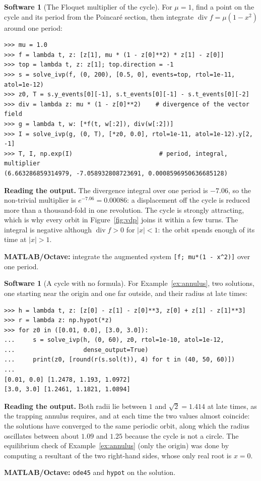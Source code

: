\documentclass[11pt,a4paper]{article}
\numberwithin{equation}{section}
\theoremstyle{definition}
\newtheorem{software}[thm]{Software}
\begin{document}
\begin{software}[The Floquet multiplier of the cycle]
\label{sw:multiplier}
For $\mu = 1$, find a point on the cycle and its period from the Poincar\'e section, then integrate $\operatorname{div}f = \mu(1 - x^2)$ around one period:
{\small\begin{verbatim}
>>> mu = 1.0
>>> f = lambda t, z: [z[1], mu * (1 - z[0]**2) * z[1] - z[0]]
>>> top = lambda t, z: z[1]; top.direction = -1
>>> s = solve_ivp(f, (0, 200), [0.5, 0], events=top, rtol=1e-11, atol=1e-12)
>>> z0, T = s.y_events[0][-1], s.t_events[0][-1] - s.t_events[0][-2]
>>> div = lambda z: mu * (1 - z[0]**2)    # divergence of the vector field
>>> g = lambda t, w: [*f(t, w[:2]), div(w[:2])]
>>> I = solve_ivp(g, (0, T), [*z0, 0.0], rtol=1e-11, atol=1e-12).y[2, -1]
>>> T, I, np.exp(I)                        # period, integral, multiplier
(6.663286859314979, -7.058932808723691, 0.0008596950636685128)
\end{verbatim}}
\textbf{Reading the output.} The divergence integral over one period is $-7.06$, so the non-trivial multiplier is $e^{-7.06} = 0.00086$: a displacement off the cycle is reduced more than a thousand-fold in one revolution. The
cycle is strongly attracting, which is why every orbit in Figure~\ref{fig:vdp} joins it within a few turns. The integral is negative although $\operatorname{div}f > 0$ for $|x| < 1$: the orbit spends enough of its time at $|x| > 1$.

\textbf{MATLAB/Octave:} integrate the augmented system \texttt{[f; mu*(1 - x\^{}2)]} over one period.
\end{software}

\begin{software}[A cycle with no formula]
\label{sw:annulus}
For Example~\ref{ex:annulus}, two solutions, one starting near the origin and one far outside, and their radius at late times:
{\small\begin{verbatim}
>>> h = lambda t, z: [z[0] - z[1] - z[0]**3, z[0] + z[1] - z[1]**3]
>>> r = lambda z: np.hypot(*z)
>>> for z0 in ([0.01, 0.0], [3.0, 3.0]):
...     s = solve_ivp(h, (0, 60), z0, rtol=1e-10, atol=1e-12,
...                   dense_output=True)
...     print(z0, [round(r(s.sol(t)), 4) for t in (40, 50, 60)])
...
[0.01, 0.0] [1.2478, 1.193, 1.0972]
[3.0, 3.0] [1.2461, 1.1821, 1.0894]
\end{verbatim}}
\textbf{Reading the output.} Both radii lie between $1$ and $\sqrt2 = 1.414$ at late times, as the trapping annulus requires, and at each time the two values almost coincide: the solutions have converged to the
same periodic orbit, along which the radius oscillates between about $1.09$ and $1.25$ because the cycle is not a circle. The equilibrium check of Example~\ref{ex:annulus} (only the origin) was done by
computing a resultant of the two right-hand sides, whose only real root is $x = 0$.

\textbf{MATLAB/Octave:} \texttt{ode45} and \texttt{hypot} on the solution.
\end{software}
\end{document}
